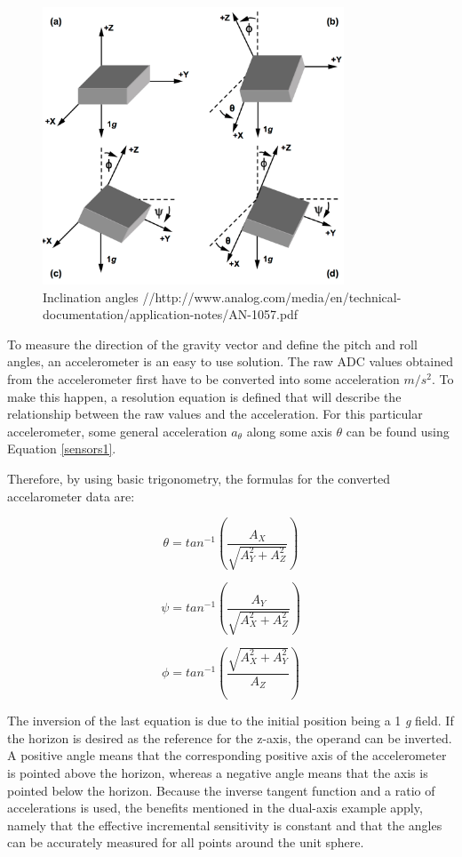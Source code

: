 \begin{figure}[H]
  \centering
    \includegraphics[width=0.8\textwidth]{images/accangle.png}
	\caption{Inclination angles //http://www.analog.com/media/en/technical-documentation/application-notes/AN-1057.pdf}
	\label{acc}
\end{figure} 
To measure the direction of the gravity vector and define the pitch and roll angles, an accelerometer is an easy to use solution.
The raw ADC values obtained from the accelerometer first have to be converted into some acceleration $m/s^2$. To make this happen, a resolution equation is defined that will describe the relationship between the raw values and the acceleration.
For this particular accelerometer, some general acceleration $a_\theta $ along some axis $\theta$ can be found using Equation \ref{sensors1}.

Therefore, by using basic trigonometry, the formulas for the converted accelarometer data are:

\begin{equation}	
 	\theta=tan^{-1}(\frac{A_{X}}{\sqrt{A_{Y}^{2}+A_{Z}^{2}}})
 \end{equation}
 
 \begin{equation}	
 	\psi=tan^{-1}(\frac{A_{Y}}{\sqrt{A_{X}^{2}+A_{Z}^{2}}})
 \end{equation}
 
 \begin{equation}	
 	\phi=tan^{-1}(\frac{\sqrt{A_{X}^{2}+A_{Y}^{2}}}{A_{Z}})
 \end{equation}
 
The inversion of the last equation is due to the initial position being a 1 \textit{g} field. If the horizon is desired as the reference for the z-axis, the operand can be inverted. A positive angle means that the corresponding positive axis of the accelerometer is pointed above the horizon, whereas a negative angle means that the axis is pointed below the horizon. Because the inverse tangent function and a ratio of accelerations is used, the benefits mentioned in the dual-axis example apply, namely that the effective incremental sensitivity is constant and that the angles can be accurately measured for all points around the unit sphere.

